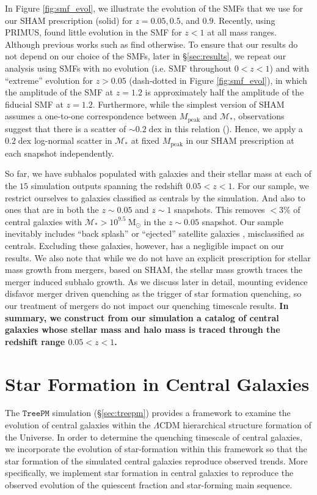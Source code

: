 \documentclass[iop,apj,tighten,twocolappendix,numberedappendix]{emulateapj}
\begin{document}
In Figure \ref{fig:smf_evol}, 
we illustrate the evolution of the SMFs that we use for our 
SHAM prescription (solid) for $z = 0.05, 0.5$, and $0.9$.
Recently, using PRIMUS, \cite{Moustakas:2013aa} found little 
evolution in the SMF for $z < 1$ at all mass ranges. Although 
previous works such as \cite{Bundy:2006aa} find otherwise. 
To ensure that our results do not depend on our choice of the SMFs, 
later in \S \ref{sec:results}, we repeat our analysis using 
SMFs with no evolution (i.e. \citealt{Li:2009aa} SMF throughout $0< z <1$)
and with ``extreme'' evolution for $z > 0.05$ (dash-dotted in Figure 
\ref{fig:smf_evol}), in which the amplitude of the SMF at $z = 1.2$ 
is approximately half the amplitude of the fiducial SMF at $z = 1.2$.
Furthermore, while the simplest version of SHAM assumes a one-to-one 
correspondence between $M_\mathrm{peak}$ and $\mathcal{M}_*$, observations 
suggest that there is a scatter of $\sim 0.2\;\mathrm{dex}$
in this relation (\citealt{Zheng:2007aa, Yang:2008aa, More:2009aa, Gu:2016aa}).
Hence, we apply a $0.2\;\mathrm{dex}$ log-normal scatter in $\mathcal{M}_*$ 
at fixed $M_\mathrm{peak}$ in our SHAM prescription at each snapshot 
independently. 

So far, we have subhalos populated with galaxies and their 
stellar mass at each of the $15$ simulation outputs spanning 
the redshift $0.05 < z < 1$. 
For our sample, we restrict ourselves to galaxies classified 
as centrals by the simulation. And also to ones that are in 
both the $z\sim 0.05$ and $z\sim 1$ snapshots. This removes 
$< 3\%$ of central galaxies with $\mathcal{M}_* > 10^{9.5}~\mathrm{M}_\odot$ 
in the $z \sim 0.05$ snapshot. Our sample inevitably includes ``back splash'' 
or ``ejected'' satellite galaxies \citep{Wetzel:2014aa}, misclassified 
as centrals. Excluding these galaxies, however, has a negligible 
impact on our results. We also note that while we do not have 
an explicit prescription for stellar mass growth from mergers, 
based on SHAM, the stellar mass growth traces the merger induced 
subhalo growth. As we discuss later in detail, mounting evidence 
disfavor merger driven quenching as the trigger of star formation 
quenching, so our treatment of mergers do not impact our quenching
timescale results. 
{\color{red} \bf In summary, we construct from our simulation a catalog of central galaxies whose stellar mass and halo mass is traced through the redshift range $0.05 < z < 1$.}

\section{Star Formation in Central Galaxies} \label{sec:model}
The $\mathtt{TreePM}$ simulation (\S \ref{sec:treepm}) provides a framework to examine 
the evolution of central galaxies within the $\Lambda$CDM hierarchical 
structure formation 
of the Universe. In order to determine the quenching timescale of central galaxies, 
we incorporate the evolution of star-formation within this framework so that 
the star formation of the simulated central galaxies reproduce observed trends. 
More specifically, we implement star formation in central galaxies to reproduce
the observed evolution of the quiescent fraction and star-forming main sequence. 
\end{document}
